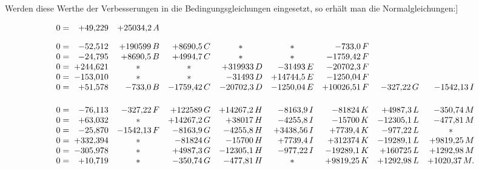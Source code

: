 Werden diese Werthe der Verbesserungen in die Bedingungsgleichungen
eingesetzt, so erhält man die Normalgleichungen:]

\begin{landscape}
\begingroup
\setlength{\arraycolsep}{2.5pt}
\renewcommand{\arraystretch}{1.45}
\[
\begin{array}{r@{\;}r*{7}{r}}
0={} & +49{,}229 & +25034{,}2\,A & & & & & &\\[1em]
0={} & -52{,}512 & +190599\,B & +8690{,}5\,C & \multicolumn{1}{c}{\ast} & \multicolumn{1}{c}{\ast} & -733{,}0\,F & &\\
0={} & -24{,}795 & +8690{,}5\,B & +4994{,}7\,C & \multicolumn{1}{c}{\ast} & \multicolumn{1}{c}{\ast} & -1759{,}42\,F & &\\
0={} & +244{,}621 & \multicolumn{1}{c}{\ast} & \multicolumn{1}{c}{\ast} & +319933\,D & -31493\,E & -20702{,}3\,F & &\\
0={} & -153{,}010 & \multicolumn{1}{c}{\ast} & \multicolumn{1}{c}{\ast} & -31493\,D & +14744{,}5\,E & -1250{,}04\,F & &\\
0={} & +51{,}578 & -733{,}0\,B & -1759{,}42\,C & -20702{,}3\,D & -1250{,}04\,E & +10026{,}51\,F & -327{,}22\,G & -1542{,}13\,I
\\[1.5em]
0={} & -76{,}113 & -327{,}22\,F & +122589\,G & +14267{,}2\,H & -8163{,}9\,I & -81824\,K & +4987{,}3\,L & -350{,}74\,M\\
0={} & +63{,}032 & \multicolumn{1}{c}{\ast} & +14267{,}2\,G & +38017\,H & -4255{,}8\,I & -15700\,K & -12305{,}1\,L & -477{,}81\,M\\
0={} & -25{,}870 & -1542{,}13\,F & -8163{,}9\,G & -4255{,}8\,H & +3438{,}56\,I & +7739{,}4\,K & -977{,}22\,L & \multicolumn{1}{c}{\ast}\\
0={} & +332{,}394 & \multicolumn{1}{c}{\ast} & -81824\,G & -15700\,H & +7739{,}4\,I & +312374\,K & -19289{,}1\,L & +9819{,}25\,M\\
0={} & -305{,}978 & \multicolumn{1}{c}{\ast} & +4987{,}3\,G & -12305{,}1\,H & -977{,}22\,I & -19289{,}1\,K & +160725\,L & +1292{,}98\,M\\
0={} & +10{,}719 & \multicolumn{1}{c}{\ast} & -350{,}74\,G & -477{,}81\,H & \multicolumn{1}{c}{\ast} & +9819{,}25\,K & +1292{,}98\,L & +1020{,}37\,M.
\end{array}
\]
\endgroup
\end{landscape}

